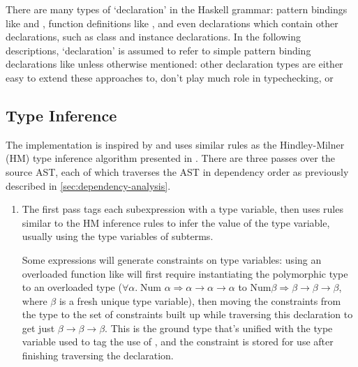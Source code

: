 \documentclass[dissertation.tex]{subfiles}
\begin{document}
{    

    There are many types of `declaration' in the Haskell grammar: pattern bindings like  and , function definitions like , and even declarations which contain
    other declarations, such as class and instance declarations. In the following descriptions, `declaration' is assumed
    to refer to simple pattern binding declarations like  unless otherwise mentioned: other declaration
    types are either easy to extend these approaches to, don't play much role in typechecking, or 


    \subsection{Type Inference}
    {

        The implementation is inspired by \cite{THIH} and uses similar rules as the Hindley-Milner (HM) type inference
        algorithm presented in \cite{HM-rules}. There are three passes over the source AST, each of which traverses the
        AST in dependency order as previously described in \ref{sec:dependency-analysis}.

        \begin{enumerate}
        \item
        {
            
            The first pass tags each subexpression with a type variable, then uses rules similar to the HM inference
            rules to infer the value of the type variable, usually using the type variables of subterms.
            
            Some expressions will generate constraints on type variables: using an overloaded function like
            \haskell{(+)} will first require instantiating the polymorphic type to an overloaded type
            (\(\forall\alpha.\;\text{Num }\alpha\Rightarrow\alpha\rightarrow\alpha\rightarrow\alpha\) to
            \(\text{Num}\beta\Rightarrow\beta\rightarrow\beta\rightarrow\beta\), where \(\beta\) is a fresh unique type
            variable), then moving the constraints from the type to the set of constraints built up while traversing
            this declaration to get just \(\beta\rightarrow\beta\rightarrow\beta\). This is the ground type that's
            unified with the type variable used to tag the use of \haskell{(+)}, and the constraint is stored for use
            after finishing traversing the declaration.

}
\end{enumerate}}}
\end{document}
